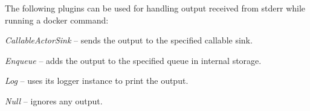 \documentclass[a4paper]{book}
\begin{document}
\noindent The following plugins can be used for handling output received from stderr while running a docker command:
\begin{tight_itemize}
  \item \textit{CallableActorSink} -- sends the output to the specified callable sink.
  \item \textit{Enqueue} -- adds the output to the specified queue in internal storage.
  \item \textit{Log} -- uses its logger instance to print the output.
  \item \textit{Null} -- ignores any output.
\end{tight_itemize}



\end{document}
